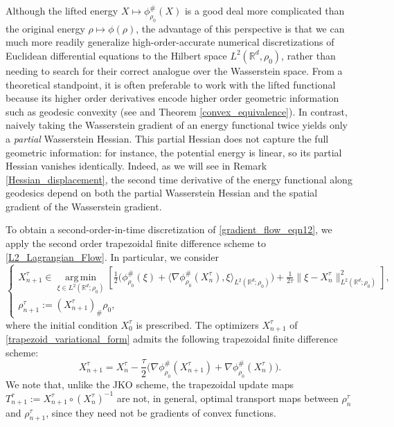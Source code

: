\documentclass[11pt,a4paper]{amsart}
\newcommand{\1}{\mathds{1}}
\newcommand{\R}{{\mathbb R}}
\numberwithin{equation}{section}
\begin{document}
 Although the lifted energy $X\mapsto \phi^{\#}_{\rho_0}(X)$ is a good deal more complicated than the original energy $\rho\mapsto \phi(\rho)$, the advantage of this perspective is that we can much more readily generalize high-order-accurate numerical discretizations of Euclidean differential equations to the Hilbert space $L^2(\R^d,\rho_0)$, rather than needing to search for their correct analogue over the Wasserstein space. From a theoretical standpoint, it is often preferable to work with the lifted functional because its higher order derivatives encode higher order geometric information such as geodesic convexity (see \cite[Lemma 3.6]{gangbo2019differentiability} and Theorem \ref{convex_equivalence}). In contrast, naively taking the Wasserstein gradient of an energy functional twice yields only a \emph{partial} Wasserstein Hessian. This partial Hessian does not capture the full geometric information: for instance, the potential energy is linear, so its partial Hessian vanishes identically. Indeed, as we will see in Remark \ref{Hessian_displacement}, the second time derivative of the energy functional along geodesics depend on both the partial Wasserstein Hessian and the spatial gradient of the Wasserstein gradient.
 

To obtain a second-order-in-time discretization of \eqref{gradient_flow_eqn12}, we apply the second order trapezoidal finite difference scheme to \eqref{L2_Lagrangian_Flow}. In particular, we consider
\begin{equation}
\begin{cases}
X^{\tau}_{n+1}
\in \operatorname*{arg\,min}_{\xi \in L^2(\mathbb{R}^d;\rho_0)}
\left[
\frac{1}{2}\bigl(\phi^{\#}_{\rho_0}(\xi)
+ \langle
\nabla \phi^{\#}_{\rho_0}(X^{\tau}_n),
\xi
\rangle_{L^2(\mathbb{R}^d;\rho_0)}
\bigr)
+ \frac{1}{2 \tau}\|\xi - X^{\tau}_n\|_{L^2(\mathbb{R}^d;\rho_0)}^2
\right], \\
\rho^{\tau}_{n+1} := (X^{\tau}_{n+1})_{\#} \rho_0,
\end{cases}
\label{trapezoid_variational_form}
\end{equation}
where the initial condition $X^{\tau}_0$ is prescribed.
 The optimizers $X^{\tau}_{n+1}$ of \eqref{trapezoid_variational_form} admits the following trapezoidal finite difference scheme:
\begin{equation}
X^{\tau}_{n+1}
= X^{\tau}_n
- \frac{\tau}{2} \bigl(
\nabla \phi^{\#}_{\rho_0}(X^{\tau}_{n+1})
+ \nabla \phi^{\#}_{\rho_0}(X^{\tau}_{n})
\bigr). \label{trapezoid_rule123}
\end{equation}
We note that, unlike the JKO scheme, the trapezoidal update maps
$T^{\tau}_{n+1} := X^{\tau}_{n+1} \circ (X^{\tau}_n)^{-1}$
are not, in general, optimal transport maps between
$\rho_{n}^{\tau}$ and $\rho_{n+1}^{\tau}$, since they need not be gradients of convex functions.
\end{document}
